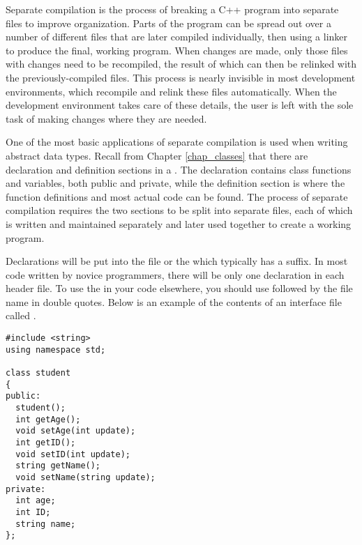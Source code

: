 
Separate compilation is the process of breaking a C++ program into separate files to improve organization. 
Parts of the program can be spread out over a number of different files that are later compiled individually, then  using a linker to produce the final, working program. 
When changes are made, only those files with changes need to be recompiled, the result of which can then be relinked with the previously-compiled files. 
This process is nearly invisible in most development environments, which recompile and relink these files automatically.
When the development environment takes care of these details, the user is left with the sole task of making changes where they are needed. 

One of the most basic applications of separate compilation is used when writing abstract data types. 
Recall from Chapter \ref{chap_classes} that there are declaration and definition sections in a . 
The declaration contains class functions and variables, both public and private, while the definition section is where the function definitions and most actual code can be found. 
The process of separate compilation requires the two sections to be split into separate files, each of which is written and maintained separately and later used together to create a working program. 

Declarations will be put into the  file or the  which typically has a  suffix.
In most code written by novice programmers, there will be only one  declaration in each header file. 
To use the  in your code elsewhere, you should use  followed by the file name in double quotes. 
Below is an example of the contents of an interface file called .

\noindent\begin{minipage}{\linewidth}\begin{lstlisting}
#include <string>
using namespace std;

class student
{
public:
  student();
  int getAge();
  void setAge(int update);
  int getID();
  void setID(int update);
  string getName();
  void setName(string update);
private:
  int age;
  int ID;
  string name;
};
\end{lstlisting}\end{minipage}

